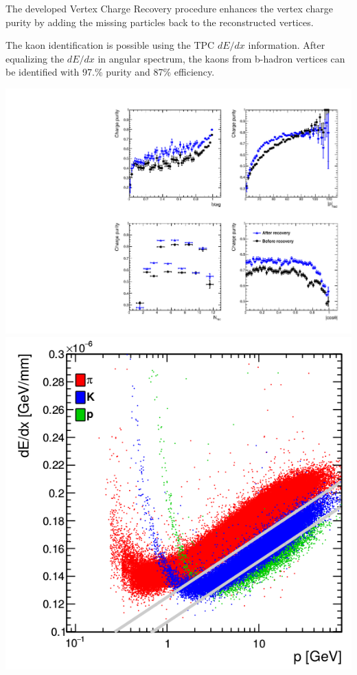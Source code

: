 \color{DarkSlateGray}
The developed Vertex Charge Recovery procedure enhances the vertex charge purity by adding the missing particles back to the reconstructed vertices. 


The kaon identification is possible using the TPC $dE/dx$ information. After equalizing the $dE/dx$ in angular spectrum, the kaons from b-hadron vertices can be identified with 97.\% purity and 87\% efficiency.
\begin{center}\vspace{1cm}
	
	\includegraphics[clip, trim=10cm 0cm 0cm 10cm,width=0.4\linewidth]{../ILD/plots/recovery-purity-comparison.pdf}\label{fig:Charges_a_3}
	\includegraphics[width=0.37\linewidth]{plots/dedx.png}\label{fig:Charges_b_3}
	\label{fig:Charges_3}
\end{center}\vspace{1cm}



